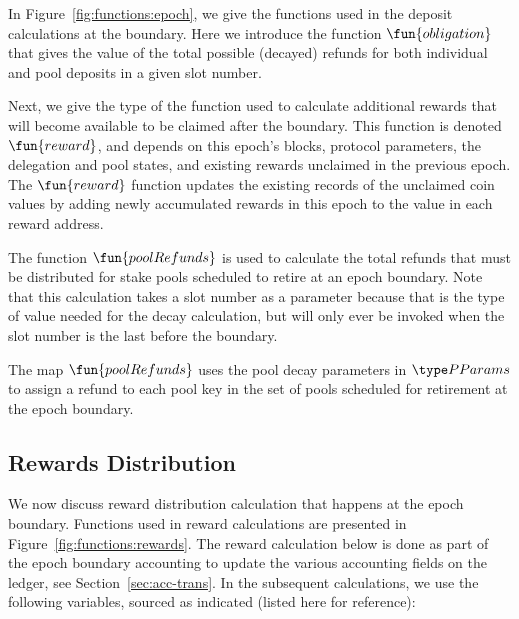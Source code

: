 In Figure~\ref{fig:functions:epoch}, we give the functions used in the deposit
calculations at the boundary. Here we introduce the function $\fun{obligation}$
that gives the value of the total possible (decayed) refunds for both individual
and pool deposits in a given slot number.

Next, we give the type of the function used to calculate additional rewards that
will become available to be claimed after the boundary. This function is denoted
$\fun{reward}$, and depends on this epoch's blocks, protocol parameters, the
delegation and pool states, and existing rewards unclaimed in the previous
epoch.  The $\fun{reward}$ function updates the existing records of the
unclaimed coin values by adding newly accumulated rewards in this epoch to the
value in each reward address.

The function $\fun{poolRefunds}$ is used to calculate the total refunds
that must be distributed
for stake pools scheduled to retire at an epoch boundary. Note that this
calculation takes a slot number as a parameter because that is the type of value
needed for the decay calculation, but will only ever be invoked
when the slot number is the last before the boundary.

The map $\fun{poolRefunds}$ uses the pool decay parameters in $\PParams$
to assign a refund to each pool key in the set of pools scheduled for retirement
at the epoch boundary.

\subsection{Rewards Distribution}
\label{sec:reward-dist}

We now discuss reward distribution calculation that happens at the epoch boundary.
Functions used in reward calculations are presented in
Figure~\ref{fig:functions:rewards}. The reward calculation below is done as part of the
epoch boundary accounting to update the various accounting fields on the ledger,
see Section~\ref{sec:acc-trans}. In the subsequent calculations, we use the
following variables, sourced as indicated (listed here for reference):

